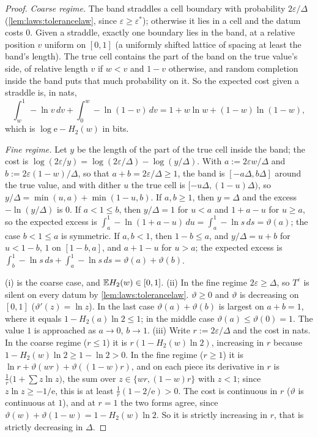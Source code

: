 \begin{proof}
\emph{Coarse regime.} The band straddles a cell boundary with probability $2\varepsilon/\Delta$ (\cref{lem:laws:tolerancelaw}, since $\varepsilon\ge\varepsilon^*$); otherwise it lies in a cell and the datum costs $0$. Given a straddle, exactly one boundary lies in the band, at a relative position $v$ uniform on $[0,1]$ (a uniformly shifted lattice of spacing at least the band's length). The true cell contains the part of the band on the true value's side, of relative length $v$ if $w<v$ and $1-v$ otherwise, and random completion inside the band puts that much probability on it. So the expected cost given a straddle is, in nats,
\[\int_w^1-\ln v\,dv+\int_0^w-\ln(1-v)\,dv=1+w\ln w+(1-w)\ln(1-w),\]
which is $\log\mathrm e-H_2(w)$ in bits.

\emph{Fine regime.} Let $y$ be the length of the part of the true cell inside the band; the cost is $\log(2\varepsilon/y)=\log(2\varepsilon/\Delta)-\log(y/\Delta)$. With $a:=2\varepsilon w/\Delta$ and $b:=2\varepsilon(1-w)/\Delta$, so that $a+b=2\varepsilon/\Delta\ge1$, the band is $[-a\Delta,b\Delta]$ around the true value, and with dither $u$ the true cell is $[-u\Delta,(1-u)\Delta)$, so $y/\Delta=\min(u,a)+\min(1-u,b)$. If $a,b\ge1$, then $y=\Delta$ and the excess $-\ln(y/\Delta)$ is $0$. If $a<1\le b$, then $y/\Delta=1$ for $u<a$ and $1+a-u$ for $u\ge a$, so the expected excess is $\int_a^1-\ln(1+a-u)\,du=\int_a^1-\ln s\,ds=\vartheta(a)$; the case $b<1\le a$ is symmetric. If $a,b<1$, then $1-b\le a$, and $y/\Delta=u+b$ for $u<1-b$, $1$ on $[1-b,a]$, and $a+1-u$ for $u>a$; the expected excess is $\int_b^1-\ln s\,ds+\int_a^1-\ln s\,ds=\vartheta(a)+\vartheta(b)$.

(i) is the coarse case, and $\mathbb{E} H_2(w)\in[0,1]$. (ii) In the fine regime $2\varepsilon\ge\Delta$, so $T^\varepsilon$ is silent on every datum by \cref{lem:laws:tolerancelaw}. $\vartheta\ge0$ and $\vartheta$ is decreasing on $[0,1]$ ($\vartheta'(z)=\ln z$). In the last case $\vartheta(a)+\vartheta(b)$ is largest on $a+b=1$, where it equals $1-H_2(a)\ln2\le1$; in the middle case $\vartheta(a)\le\vartheta(0)=1$. The value $1$ is approached as $a\to0$, $b\to1$. (iii) Write $r:=2\varepsilon/\Delta$ and the cost in nats. In the coarse regime ($r\le1$) it is $r(1-H_2(w)\ln2)$, increasing in $r$ because $1-H_2(w)\ln2\ge1-\ln2>0$. In the fine regime ($r\ge1$) it is $\ln r+\vartheta(wr)+\vartheta((1-w)r)$, and on each piece its derivative in $r$ is $\frac1r\big(1+\sum z\ln z\big)$, the sum over $z\in\{wr,(1-w)r\}$ with $z<1$; since $z\ln z\ge-1/\mathrm e$, this is at least $\frac1r(1-2/\mathrm e)>0$. The cost is continuous in $r$ ($\vartheta$ is continuous at $1$), and at $r=1$ the two forms agree, since $\vartheta(w)+\vartheta(1-w)=1-H_2(w)\ln2$. So it is strictly increasing in $r$, that is strictly decreasing in $\Delta$.
\end{proof}

